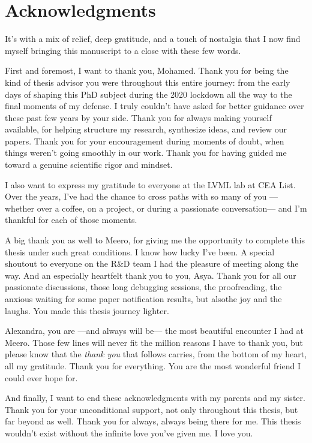 \chapter{Acknowledgments}

It's with a mix of relief, deep gratitude, and a touch of nostalgia that I now find myself bringing this manuscript to a close with these few words.

First and foremost, I want to thank you, Mohamed. Thank you for being the kind of thesis advisor you were throughout this entire journey: from the early days of shaping this PhD subject during the 2020 lockdown all the way to the final moments of my defense. I truly couldn't have asked for better guidance over these past few years by your side. Thank you for always making yourself available, for helping structure my research, synthesize ideas, and review our papers. Thank you for your encouragement during moments of doubt, when things weren't going smoothly in our work. Thank you for having guided me toward a genuine scientific rigor and mindset. 

I also want to express my gratitude to everyone at the LVML lab at CEA List. Over the years, I've had the chance to cross paths with so many of you —whether over a coffee, on a project, or during a passionate conversation— and I'm thankful for each of those moments.

A big thank you as well to Meero, for giving me the opportunity to complete this thesis under such great conditions. I know how lucky I've been. A special shoutout to everyone on the R\&D team I had the pleasure of meeting along the way. And an especially heartfelt thank you to you, Asya. Thank you for all our passionate discussions, those long debugging sessions, the proofreading, the anxious waiting for some paper notification results, but alsothe joy and the laughs. You made this thesis journey lighter. 

Alexandra, you are —and always will be— the most beautiful encounter I had at Meero. Those few lines will never fit the million reasons I have to thank you, but please know that the \textit{thank you} that follows carries, from the bottom of my heart, all my gratitude. Thank you for everything. You are the most wonderful friend I could ever hope for.

And finally, I want to end these acknowledgments with my parents and my sister. Thank you for your unconditional support, not only throughout this thesis, but far beyond as well. Thank you for always, always being there for me. This thesis wouldn't exist without the infinite love you've given me. I love you.